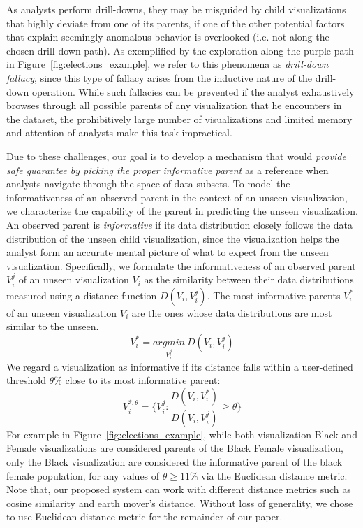 \par As analysts perform drill-downs, they may be misguided by child visualizations that highly deviate from one of its parents, if one of the other potential factors that explain seemingly-anomalous behavior is overlooked (i.e. not along the chosen drill-down path). As exemplified by the exploration along the purple path in Figure~\ref{fig:elections_example}, we refer to this phenomena as \emph{drill-down fallacy}, since this type of fallacy arises from the inductive nature of the drill-down operation. %
While such fallacies can be prevented if the analyst exhaustively browses through all possible parents of any visualization that he encounters in the dataset, the prohibitively large number of visualizations and limited memory and attention of analysts make this task impractical.
\par Due to these challenges, our goal is to develop a mechanism that would  \emph{provide safe guarantee by picking the proper informative parent} as a reference when analysts navigate through the space of data subsets.  To model the informativeness of an observed parent in the context of an unseen visualization, we characterize the capability of the parent in predicting the unseen visualization. An observed parent is \emph{informative} if its data distribution closely follows the data distribution of the unseen child visualization, since the visualization helps the analyst form an accurate mental picture of what to expect from the unseen visualization. Specifically, we formulate the informativeness of an observed parent $V_i^j$ of an unseen visualization $V_i$ as the similarity between their data distributions measured using a distance function $D(V_i, V_i^j)$. The most informative parents $V_i^*$ of an unseen visualization $V_i$ are the ones whose data distributions are most similar to the unseen.
\begin{equation}
    V_i^*=\underset{V_i^j}{argmin}\ D(V_i, V_i^j)
\end{equation}
We regard a visualization as informative if its distance falls within a user-defined threshold $\theta\%$ close to its most informative parent:
\begin{equation}
    V_i^{*, \theta} = \{V_i^j : \frac{D(V_i, V_i^*)}{D(V_i, V_i^j)} \geq \theta\}
\end{equation}
For example in Figure~\ref{fig:elections_example}, while both visualization Black and Female visualizations are considered parents of the Black Female visualization, only the Black visualization are considered the informative parent of the black female population, for any values of $\theta \geq 11\%$ via the Euclidean distance metric. Note that, our proposed system can work with different distance metrics such as cosine similarity and earth mover's distance. Without loss of generality, we chose to use Euclidean distance metric for the remainder of our paper.
